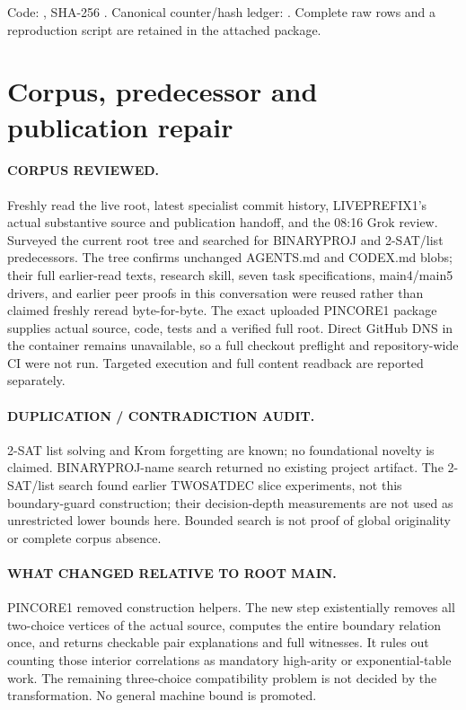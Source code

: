 \documentclass[11pt]{article}
\begin{document}
Code: , SHA-256
.
Canonical counter/hash ledger:
.
Complete raw rows and a reproduction script are retained in the attached package.

\section{Corpus, predecessor and publication repair}
\paragraph{CORPUS REVIEWED.}
Freshly read the live root, latest specialist commit history, LIVEPREFIX1's
actual substantive source and publication handoff, and the 08:16 Grok review.
Surveyed the current root tree and searched for BINARYPROJ and 2-SAT/list
predecessors. The tree confirms unchanged AGENTS.md and CODEX.md blobs;
their full earlier-read texts, research skill, seven task specifications,
main4/main5 drivers, and earlier peer proofs in this conversation were reused
rather than claimed freshly reread byte-for-byte. The exact uploaded PINCORE1
package supplies actual source, code, tests and a verified full root.
Direct GitHub DNS in the container remains unavailable, so a full checkout
preflight and repository-wide CI were not run. Targeted execution and full
content readback are reported separately.

\paragraph{DUPLICATION / CONTRADICTION AUDIT.}
2-SAT list solving and Krom forgetting are known; no foundational novelty is
claimed. BINARYPROJ-name search returned no existing project artifact.
The 2-SAT/list search found earlier TWOSATDEC slice experiments, not this
boundary-guard construction; their decision-depth measurements are not used
as unrestricted lower bounds here. Bounded search is not proof of global
originality or complete corpus absence.

\paragraph{WHAT CHANGED RELATIVE TO ROOT MAIN.}
PINCORE1 removed construction helpers. The new step existentially removes
all two-choice vertices of the actual source, computes the entire boundary
relation once, and returns checkable pair explanations and full witnesses.
It rules out counting those interior correlations as mandatory high-arity or
exponential-table work. The remaining three-choice compatibility problem is
not decided by the transformation. No general machine bound is promoted.
\end{document}
